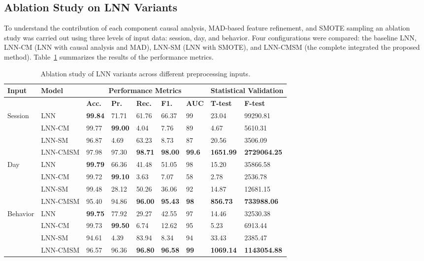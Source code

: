 \subsection{Ablation Study on LNN Variants}
To understand the contribution of each component causal analysis, MAD-based feature refinement, and SMOTE sampling an ablation study was carried out using three levels of input data: session, day, and behavior. Four configurations were compared: the baseline LNN, LNN-CM (LNN with causal analysis and MAD), LNN-SM (LNN with SMOTE), and LNN-CMSM (the complete integrated the proposed method). Table~\ref{tab:ablation_grouped} summarizes the results of the performance metrics.
\begin{table}[!ht]
\centering
\caption{Ablation study of LNN variants across different preprocessing inputs.}
\label{tab:ablation_grouped}
\renewcommand{\arraystretch}{1.3} %
\setlength{\tabcolsep}{5pt}      %
\small
\begin{tabular}{|l|l|l|l|l|l|l|l|l|}
\hline
\textbf{Input} & \textbf{Model} 
& \multicolumn{5}{c|}{\textbf{Performance Metrics}} 
& \multicolumn{2}{c|}{\textbf{Statistical Validation}} \\
\hline
 &  & \textbf{Acc.} & \textbf{Pr.} & \textbf{Rec.} & \textbf{F1.} & \textbf{AUC} & \textbf{T-test} & \textbf{F-test} \\
\hline
\multirow{4}{*}{Session} 
 & \raggedright LNN & \textbf{99.84} & 71.71 & 61.76 & 66.37 & 99 & 23.04 & 99290.81 \\ \cline{2-9}
 & \raggedright LNN-CM & 99.77 & \textbf{99.00} & 4.04 & 7.76 & 89 & 4.67 & 5610.31 \\ \cline{2-9}
 & \raggedright LNN-SM & 96.87 & 4.69 & 63.23 & 8.73 & 87 & 20.56 & 3506.09 \\ \cline{2-9}
 & \raggedright LNN-CMSM & 97.98 & 97.30 & \textbf{98.71} & \textbf{98.00} & \textbf{99.6} & \textbf{1651.99} & \textbf{2729064.25} \\
\hline
\multirow{4}{*}{Day} 
 & \raggedright LNN & \textbf{99.79} & 66.36 & 41.48 & 51.05 & 98 & 15.20 & 35866.58 \\ \cline{2-9}
 & \raggedright LNN-CM & 99.72 & \textbf{99.10} & 3.63 & 7.07 & 58 & 2.78 & 2536.78 \\ \cline{2-9}
 & \raggedright LNN-SM & 99.48 & 28.12 & 50.26 & 36.06 & 92 & 14.87 & 12681.15 \\ \cline{2-9}
 & \raggedright LNN-CMSM & 95.40 & 94.86 & \textbf{96.00} & \textbf{95.43} & \textbf{98} & \textbf{856.73} & \textbf{733988.06} \\
\hline
\multirow{4}{*}{Behavior} 
 & \raggedright LNN & \textbf{99.75} & 77.92 & 29.27 & 42.55 & 97 & 14.46 & 32530.38 \\ \cline{2-9}
 & \raggedright LNN-CM & 99.73 & \textbf{99.50} & 6.74 & 12.62 & 95 & 5.23 & 6913.44 \\ \cline{2-9}
 & \raggedright LNN-SM & 94.61 & 4.39 & 83.94 & 8.34 & 94 & 33.43 & 2385.47 \\ \cline{2-9}
 & \raggedright LNN-CMSM & 96.57 & 96.36 & \textbf{96.80} & \textbf{96.58} & \textbf{99} & \textbf{1069.14} & \textbf{1143054.88} \\
\hline
\end{tabular}


\end{table}
